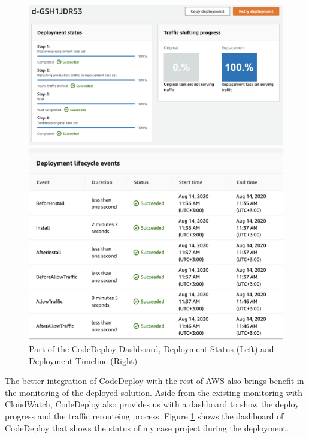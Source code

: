 \begin{figure}[!tbp]
     \centering
     \begin{minipage}[b]{0.50\textwidth}
       \includegraphics[width=\textwidth]{pics/codedeploy_steps.png}
     \end{minipage}
     \hfill
     \begin{minipage}[b]{0.48\textwidth}
       \includegraphics[width=\textwidth]{pics/codedeploy_time.png}
     \end{minipage}
     \label{fig:codedeploy_steps}
     \caption{Part of the CodeDeploy Dashboard, Deployment Status (Left) and Deployment Timeline (Right)}
\end{figure}
\par
The better integration of CodeDeploy with the rest of AWS also brings benefit in the monitoring of the deployed solution. Aside from the existing monitoring with CloudWatch, CodeDeploy also provides us with a dashboard to show the deploy progress and the traffic rerouteing process. Figure \ref{fig:codedeploy_steps} shows the dashboard of CodeDeploy that shows the status of my case project during the deployment.
